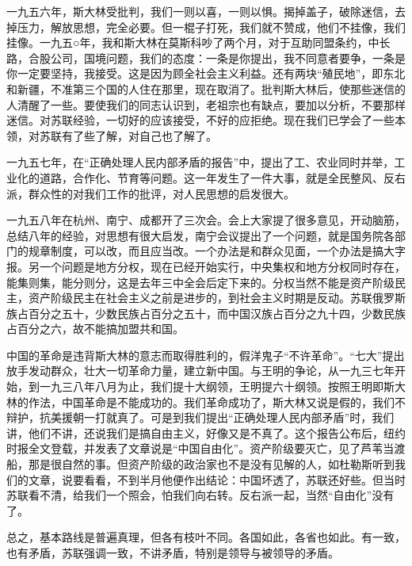 一九五六年，斯大林受批判，我们一则以喜，一则以惧。揭掉盖子，破除迷信，去掉压力，解放思想，完全必要。但一棍子打死，我们就不赞成，他们不挂像，我们挂像。一九五○年，我和斯大林在莫斯科吵了两个月，对于互助同盟条约，中长路，合股公司，国境问题，我们的态度：一条是你提出，我不同意者要争，一条是你一定要坚持，我接受。这是因为顾全社会主义利益。还有两块“殖民地”，即东北和新疆，不准第三个国的人住在那里，现在取消了。批判斯大林后，使那些迷信的人清醒了一些。要使我们的同志认识到，老祖宗也有缺点，要加以分析，不要那样迷信。对苏联经验，一切好的应该接受，不好的应拒绝。现在我们已学会了一些本领，对苏联有了些了解，对自己也了解了。

一九五七年，在“正确处理人民内部矛盾的报告”中，提出了工、农业同时并举，工业化的道路，合作化、节育等问题。这一年发生了一件大事，就是全民整风、反右派，群众性的对我们工作的批评，对人民思想的启发很大。

一九五八年在杭州、南宁、成都开了三次会。会上大家提了很多意见，开动脑筋，总结八年的经验，对思想有很大启发，南宁会议提出了一个问题，就是国务院各部门的规章制度，可以改，而且应当改。一个办法是和群众见面，一个办法是搞大字报。另一个问题是地方分权，现在已经开始实行，中央集权和地方分权同时存在，能集则集，能分则分，这是去年三中全会后定下来的。分权当然不能是资产阶级民主，资产阶级民主在社会主义之前是进步的，到社会主义时期是反动。苏联俄罗斯族占百分之五十，少数民族占百分之五十，而中国汉族占百分之九十四，少数民族占百分之六，故不能搞加盟共和国。

中国的革命是违背斯大林的意志而取得胜利的，假洋鬼子“不许革命”。“七大”提出放手发动群众，壮大一切革命力量，建立新中国。与王明的争论，从一九三七年开始，到一九三八年八月为止，我们提十大纲领，王明提六十纲领。按照王明即斯大林的作法，中国革命是不能成功的。我们革命成功了，斯大林又说是假的，我们不辩护，抗美援朝一打就真了。可是到我们提出“正确处理人民内部矛盾”时，我们讲，他们不讲，还说我们是搞自由主义，好像又是不真了。这个报告公布后，纽约时报全文登载，并发表了文章说是“中国自由化”。资产阶级要灭亡，见了芦苇当渡船，那是很自然的事。但资产阶级的政治家也不是没有见解的人，如杜勒斯听到我们的文章，说要看看，不到半月他便作出结论：中国坏透了，苏联还好些。但当时苏联看不清，给我们一个照会，怕我们向右转。反右派一起，当然“自由化”没有了。

总之，基本路线是普遍真理，但各有枝叶不同。各国如此，各省也如此。有一致，也有矛盾，苏联强调一致，不讲矛盾，特别是领导与被领导的矛盾。

